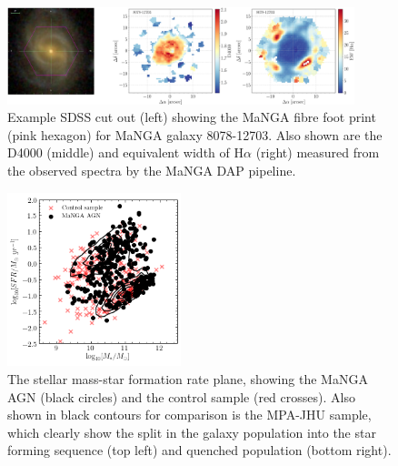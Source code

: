 \documentclass[useAMS,usenatbib]{mn2e}
\begin{document}
\begin{figure}
\includegraphics[width=0.9\textwidth]{../data/ellison/figures/image_halpha_vel_map_8078-12703_gal_aligned_ifu_bundles-MAPS-VOR10-GAU-MILESHC.pdf}
\caption{Example SDSS cut out (left) showing the MaNGA fibre foot print (pink hexagon) for MaNGA galaxy 8078-12703. Also shown are  the D4000 (middle) and equivalent width of H$\alpha$ (right) measured from the observed spectra by the MaNGA DAP pipeline. }
\end{figure}

\begin{figure}
\includegraphics[width=0.45\textwidth]{../data/ellison/figures/manga_agn_SFS_plane.png}
\caption{The stellar mass-star formation rate plane, showing the MaNGA AGN (black circles) and the control sample (red crosses). Also shown in black contours for comparison is the MPA-JHU sample, which clearly show the split in the galaxy population into the star forming sequence (top left) and quenched population (bottom right).}
\end{figure}
\end{document}
